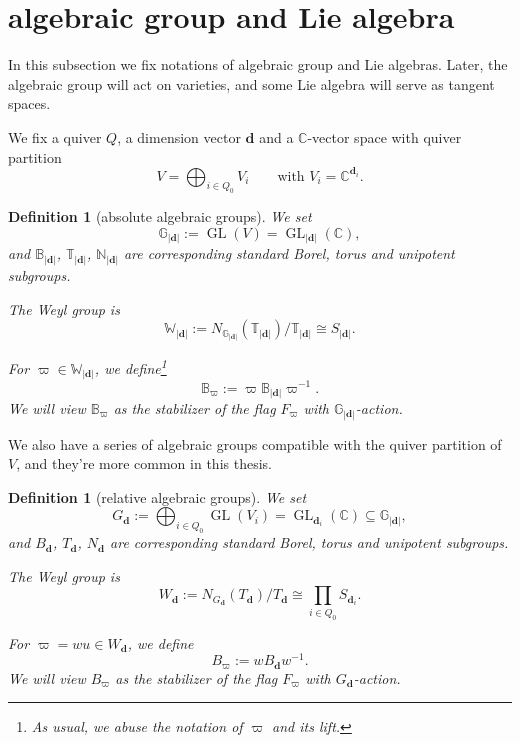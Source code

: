 \documentclass[reqno,11pt]{book}
\numberwithin{equation}{section}
\theoremstyle{plain}
\newtheorem{defn}[theorem]{Definition}
\theoremstyle{plain}
\numberwithin{equation}{section}
\theoremstyle{remark}
\DeclareMathOperator{\GL}{\operatorname{GL}}
\newcommand{\dimvec}[1]{\mathbf{#1}}
\newcommand{\abdimvec}[1]{|\dimvec{#1}|}
\newcommand{\absgp}[1]{\mathbb{#1}}
\newcommand{\ww}{\varpi}
\begin{document}
\section{algebraic group and Lie algebra}

In this subsection we fix notations of algebraic group and Lie algebras. Later, the algebraic group will act on varieties, and some Lie algebra will serve as tangent spaces.

We fix a quiver $Q$, a dimension vector $\dimvec{d}$ and a $\mathbb{C}$-vector space with quiver partition
$$V=\bigoplus_{i \in Q_0} V_i \qquad \text{with } V_i=\mathbb{C}^{\dimvec{d}_i}.$$

\begin{defn}[absolute algebraic groups]
We set
$$\absgp{G}_{\abdimvec{d}}:= \GL(V)=\GL_{\abdimvec{d}}(\mathbb{C}),$$
and $\absgp{B}_{\abdimvec{d}}$, $\absgp{T}_{\abdimvec{d}}$, $\absgp{N}_{\abdimvec{d}}$ are corresponding standard Borel, torus and unipotent subgroups.

The Weyl group is
$$\absgp{W}_{\abdimvec{d}}:= N_{\absgp{G}_{\abdimvec{d}}}(\absgp{T}_{\abdimvec{d}})/\absgp{T}_{\abdimvec{d}} \cong S_{\abdimvec{d}}.$$

For $\ww \in \absgp{W}_{\abdimvec{d}}$, we define\footnote{As usual, we abuse the notation of $\ww$ and its lift.}
$$\absgp{B}_{\ww}:= \ww \absgp{B}_{\abdimvec{d}} \ww^{-1}.$$
We will view $\absgp{B}_{\ww}$ as the stabilizer of the flag $F_{\ww}$ with $\absgp{G}_{\abdimvec{d}}$-action.
\end{defn}

We also have a series of algebraic groups compatible with the quiver partition of $V$, and they're more common in this thesis.

\begin{defn}[relative algebraic groups]

We set
$$G_{\dimvec{d}}:= \bigoplus_{i \in Q_0}\GL(V_i)=\GL_{\dimvec{d}_i}(\mathbb{C}) \subseteq \absgp{G}_{\abdimvec{d}},$$
and $B_{\dimvec{d}}$, $T_{\dimvec{d}}$, $N_{\dimvec{d}}$ are corresponding standard Borel, torus and unipotent subgroups.

The Weyl group is
$$W_{\dimvec{d}}:= N_{G_{\dimvec{d}}}(T_{\dimvec{d}})/T_{\dimvec{d}} \cong \prod_{i \in Q_0}S_{\dimvec{d}_i}.$$

For $\ww=wu \in W_{\dimvec{d}}$, we define
$$B_{\ww}:= w B_{\dimvec{d}} w^{-1}.$$
We will view $B_{\ww}$ as the stabilizer of the flag $F_{\ww}$ with $G_{\dimvec{d}}$-action.
\end{defn}
\end{document}
